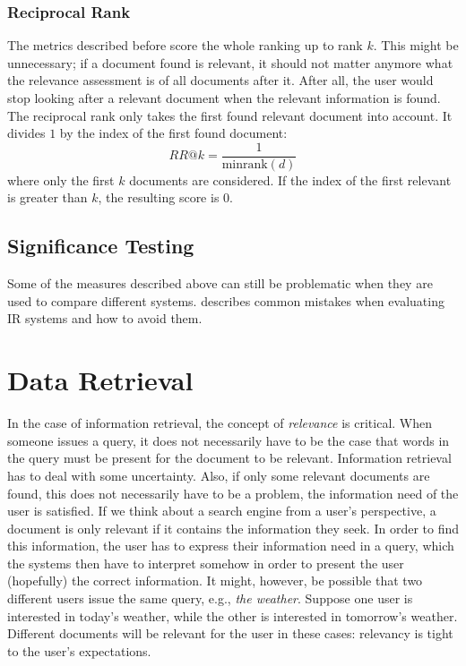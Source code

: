 \subsubsection{Reciprocal Rank} 
The metrics described before score the whole ranking up to rank $k$. This might be unnecessary; if a document found is relevant, it should not matter anymore what the relevance assessment is of all documents after it. After all, the user would stop looking after a relevant document when the relevant information is found. The reciprocal rank only takes the first found relevant document into account. It divides $1$ by the index of the first found document:
\begin{equation}
	\textit{RR@k} = \frac{1}{\text{minrank}(d)}
\end{equation}
where only the first $k$ documents are considered. If the index of the first relevant is greater than $k$, the resulting score is $0$.

\subsection{Significance Testing}
Some of the measures described above can still be problematic when they are used to compare different systems.  describes common mistakes when evaluating IR systems and how to avoid them.

\section{Data Retrieval}
In the case of information retrieval, the concept of \emph{relevance} is critical. When someone issues a query, it does not necessarily have to be the case that words in the query must be present for the document to be relevant. Information retrieval has to deal with some uncertainty. Also, if only some relevant documents are found, this does not necessarily have to be a problem, the information need of the user is satisfied. If we think about a search engine from a user's perspective, a document is only relevant if it contains the information they seek. In order to find this information, the user has to express their information need in a query, which the systems then have to interpret somehow in order to present the user (hopefully) the correct information. 
It might, however, be possible that two different users issue the same query, e.g., \emph{the weather}. Suppose one user is interested in today's weather, while the other is interested in tomorrow's weather. Different documents will be relevant for the user in these cases: relevancy is tight to the user's expectations.


